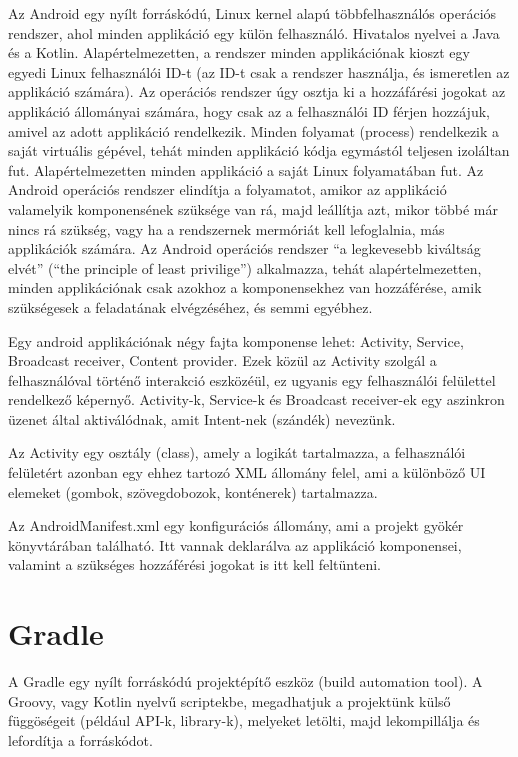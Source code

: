 Az Android egy nyílt forráskódú, Linux kernel alapú többfelhasználós operációs rendszer, ahol minden applikáció egy külön felhasználó. Hivatalos nyelvei a Java és a Kotlin. Alapértelmezetten, a rendszer minden applikációnak kioszt egy egyedi Linux felhasználói ID-t (az ID-t csak a rendszer használja, és ismeretlen az applikáció számára). Az operációs rendszer úgy osztja ki a hozzáfárési jogokat az applikáció állományai számára, hogy csak az a felhasználói ID férjen hozzájuk, amivel az adott applikáció rendelkezik. Minden folyamat (process) rendelkezik a saját virtuális gépével, tehát minden applikáció kódja egymástól teljesen izoláltan fut. Alapértelmezetten minden applikáció a saját Linux folyamatában fut. Az Android operációs rendszer elindítja a folyamatot, amikor az applikáció valamelyik komponensének szüksége van rá, majd leállítja azt, mikor többé már nincs rá szükség, vagy ha a rendszernek mermóriát kell lefoglalnia, más applikációk számára. Az Android operációs rendszer “a legkevesebb kiváltság elvét” (“the principle of least privilige”) alkalmazza, tehát alapértelmezetten, minden applikációnak csak azokhoz a komponensekhez van hozzáférése, amik szükségesek a feladatának elvégzéséhez, és semmi egyébhez.

Egy android applikációnak négy fajta komponense lehet: Activity, Service, Broadcast receiver, Content provider. Ezek közül az Activity szolgál a felhasználóval történő interakció eszközéül, ez ugyanis egy felhasználói felülettel rendelkező képernyő. Activity-k, Service-k és Broadcast receiver-ek egy aszinkron üzenet által aktiválódnak, amit Intent-nek (szándék) nevezünk.

Az Activity egy osztály (class), amely a logikát tartalmazza, a felhasználói felületért azonban egy ehhez tartozó XML állomány felel, ami a különböző UI elemeket (gombok, szövegdobozok, konténerek) tartalmazza.

Az AndroidManifest.xml egy konfigurációs állomány, ami a projekt gyökér könyvtárában található. Itt vannak deklarálva az applikáció komponensei, valamint a szükséges hozzáférési jogokat is itt kell feltünteni.


\section{Gradle}\label{sec:ALAP:adatelem}

A Gradle egy nyílt forráskódú projektépítő eszköz (build automation tool). A Groovy, vagy Kotlin nyelvű scriptekbe, megadhatjuk a projektünk külső függöségeit (például API-k, library-k), melyeket letölti, majd lekompillálja és lefordítja a forráskódot.

